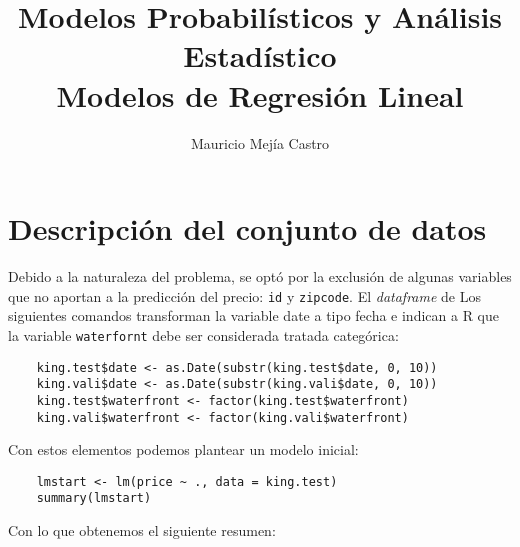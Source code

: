 \documentclass[10pt,letterpaper]{article}
\title{Modelos Probabilísticos y Análisis Estadístico\\Modelos de Regresión Lineal}
\author{Mauricio Mejía Castro}
\begin{document}
\maketitle

\section{Descripción del conjunto de datos}
Debido a la naturaleza del problema, se optó por la exclusión de algunas variables que no aportan a la predicción del precio: {\tt id} y {\tt zipcode}. El {\em dataframe} de Los siguientes comandos transforman la variable date a tipo fecha e indican a R que la variable {\tt waterfornt} debe ser considerada tratada categórica:

\begin{verbatim}
	king.test$date <- as.Date(substr(king.test$date, 0, 10))
	king.vali$date <- as.Date(substr(king.vali$date, 0, 10))
	king.test$waterfront <- factor(king.test$waterfront)
	king.vali$waterfront <- factor(king.vali$waterfront)
\end{verbatim}

Con estos elementos podemos plantear un modelo inicial:

\begin{verbatim}
	lmstart <- lm(price ~ ., data = king.test)
	summary(lmstart)
\end{verbatim}

Con lo que obtenemos el siguiente resumen:
\end{document}
